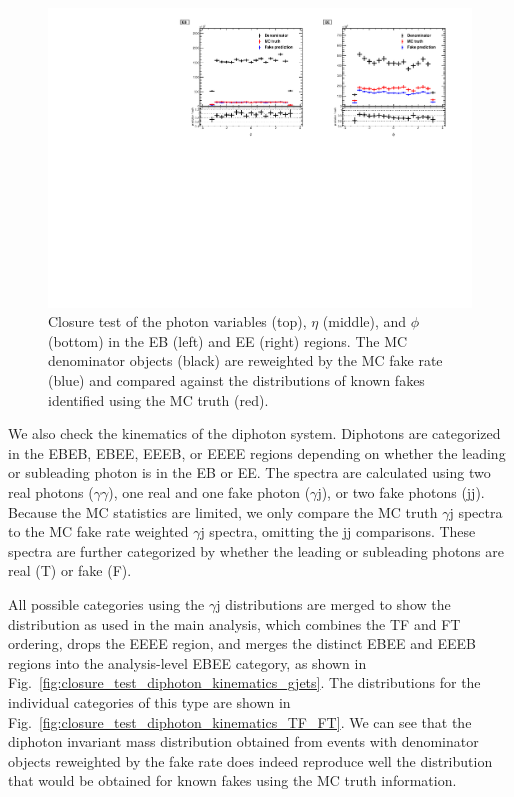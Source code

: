 \begin{figure}[!htbp]
  \includegraphics[scale=0.75]{figures/closure_test_photon_kinematics_phi.pdf}
  \caption{Closure test of the photon variables \pt (top), $\eta$ (middle), and $\phi$ (bottom) in the EB (left) and EE (right) regions. The MC denominator objects (black) are reweighted by the MC fake rate (blue) and compared against the distributions of known fakes identified using the MC truth (red).}
  \label{fig:closure_test_photon_kinematics}
\end{figure}

We also check the kinematics of the diphoton system. Diphotons are categorized in the EBEB, EBEE, EEEB, or EEEE regions depending on whether the leading or subleading photon is in the EB or EE. The \Mgg spectra are calculated using two real photons ($\gamma\gamma$), one real and one fake photon ($\gamma$j), or two fake photons (jj). Because the MC statistics are limited, we only compare the MC truth $\gamma$j spectra to the MC fake rate weighted $\gamma$j spectra, omitting the jj comparisons. These spectra are further categorized by whether the leading or subleading photons are real (T) or fake (F).

All possible categories using the $\gamma$j \Mgg distributions are merged to show the distribution as used in the main analysis, which combines the TF and FT ordering, drops the EEEE region, and merges the distinct EBEE and EEEB regions into the analysis-level EBEE category, as shown in Fig.~\ref{fig:closure_test_diphoton_kinematics_gjets}. The distributions for the individual categories of this type are shown in Fig.~\ref{fig:closure_test_diphoton_kinematics_TF_FT}. We can see that the diphoton invariant mass distribution obtained from events with denominator objects reweighted by the fake rate does indeed reproduce well the distribution that would be obtained for known fakes using the MC truth information.

